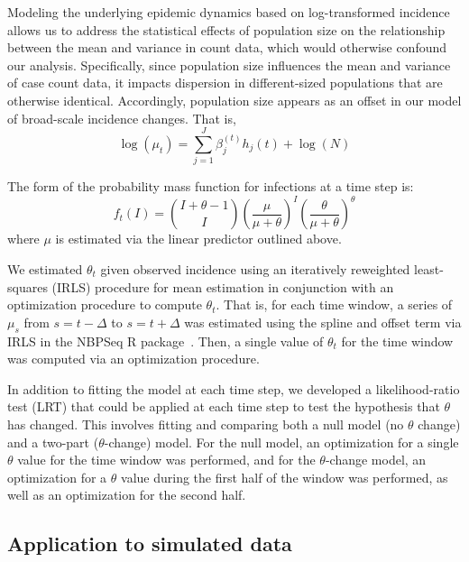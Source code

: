 \documentclass[11pt,letterpaper]{article}
\begin{document}
Modeling the underlying epidemic dynamics based on log-transformed incidence allows us to address the statistical effects of population size on the relationship between the mean and variance in count data, which would otherwise confound our analysis.
Specifically, since population size influences the mean and variance of case count data, it impacts dispersion in different-sized populations that are otherwise identical.
Accordingly, population size appears as an offset in our model of broad-scale incidence changes. That is,
\begin{equation}
  \log(\mu_t) = \sum_{j=1}^J \beta_j^{(t)} h_j(t) + \log(N) 
\end{equation}

The form of the probability mass function for infections at a time step is:
\begin{equation}
  f_t(I) = \binom{I + \theta - 1}{I} {\left( \frac{\mu}{\mu + \theta} \right)}^I {\left( \frac{\theta}{\mu + \theta} \right)}^\theta
\end{equation}
where $\mu$ is estimated via the linear predictor outlined above. 

We estimated $\theta_t$ given observed incidence using an iteratively reweighted least-squares (IRLS) procedure for mean estimation in conjunction with an optimization procedure to compute $\theta_t$. That is, for each time window, a series of $\mu_s$ from $s = t-\Delta$ to $s = t + \Delta$ was estimated using the spline and offset term via IRLS in the NBPSeq R package~\citep{di2015nbpseq}. Then, a single value of $\theta_t$ for the time window was computed via an optimization procedure. 

In addition to fitting the model at each time step, we developed a likelihood-ratio test (LRT) that could be applied at each time step to test the hypothesis that $\theta$ has changed. This involves fitting and comparing both a null model (no \begin{math}\theta\end{math} change) and a two-part ($\theta$-change) model. For the null model, an optimization for a single $\theta$ value for the time window was performed, and for the $\theta$-change model, an optimization for a $\theta$ value during the first half of the window was performed, as well as an optimization for the second half. 

\subsection*{Application to simulated data}
\end{document}
